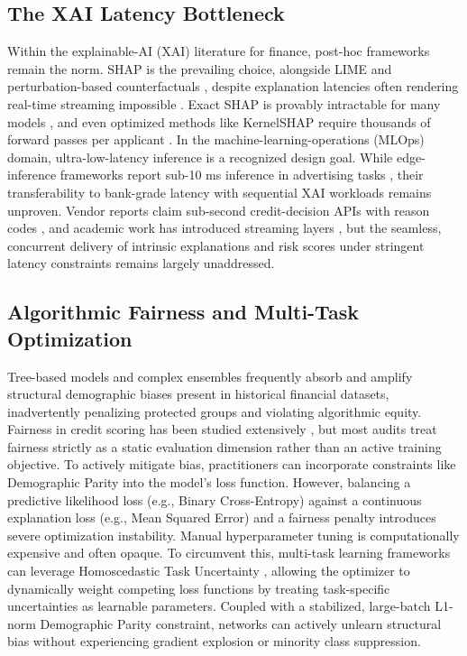 \documentclass{wscpaperproc}
\theoremstyle{wsc}
\begin{document}
\subsection{The XAI Latency Bottleneck}
Within the explainable-AI (XAI) literature for finance, post-hoc frameworks remain the norm. SHAP \cite{NIPS2017_8a20a862} is the prevailing choice, alongside LIME and perturbation-based counterfactuals \cite{Yeo2025FinancialXAIReview}, despite explanation latencies often rendering real-time streaming impossible \cite{Boehm2025ScalableSHAP}. Exact SHAP is provably intractable for many models \cite{vandenbroeck2021tractability}, and even optimized methods like KernelSHAP require thousands of forward passes per applicant \cite{jethani2022fastshap}. In the machine-learning-operations (MLOps) domain, ultra-low-latency inference is a recognized design goal. While edge-inference frameworks report sub-10 ms inference in advertising tasks \cite{Nvidia2023Triton,OpenVINO2024Latency}, their transferability to bank-grade latency with sequential XAI workloads remains unproven. Vendor reports claim sub-second credit-decision APIs with reason codes \cite{ncino2024xai,fico_platform2025,fico_responsibleai2025,upstart2025,zestai2021,provenir2025,sasviya2024}, and academic work has introduced streaming layers \cite{Martin2020KafkaML}, but the seamless, concurrent delivery of intrinsic explanations and risk scores under stringent latency constraints remains largely unaddressed.

\subsection{Algorithmic Fairness and Multi-Task Optimization}
Tree-based models and complex ensembles frequently absorb and amplify structural demographic biases present in historical financial datasets, inadvertently penalizing protected groups and violating algorithmic equity. Fairness in credit scoring has been studied extensively \cite{Hurlin2024Fairness,Nwafor2024HybridCredit}, but most audits treat fairness strictly as a static evaluation dimension rather than an active training objective. To actively mitigate bias, practitioners can incorporate constraints like Demographic Parity into the model's loss function. However, balancing a predictive likelihood loss (e.g., Binary Cross-Entropy) against a continuous explanation loss (e.g., Mean Squared Error) and a fairness penalty introduces severe optimization instability. Manual hyperparameter tuning is computationally expensive and often opaque. To circumvent this, multi-task learning frameworks can leverage Homoscedastic Task Uncertainty \cite{DBLP:journals/corr/KendallGC17}, allowing the optimizer to dynamically weight competing loss functions by treating task-specific uncertainties as learnable parameters. Coupled with a stabilized, large-batch L1-norm Demographic Parity constraint, networks can actively unlearn structural bias without experiencing gradient explosion or minority class suppression.
\end{document}
